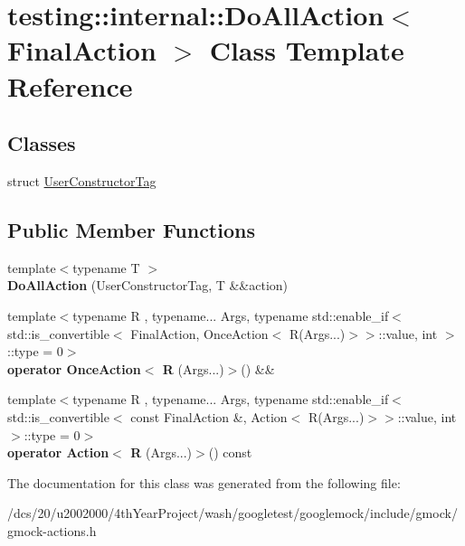 \hypertarget{classtesting_1_1internal_1_1DoAllAction_3_01FinalAction_01_4}{}\section{testing\+:\+:internal\+:\+:Do\+All\+Action$<$ Final\+Action $>$ Class Template Reference}
\label{classtesting_1_1internal_1_1DoAllAction_3_01FinalAction_01_4}
\subsection*{Classes}
\begin{DoxyCompactItemize}
\item 
struct \mbox{\hyperlink{structtesting_1_1internal_1_1DoAllAction_3_01FinalAction_01_4_1_1UserConstructorTag}{User\+Constructor\+Tag}}
\end{DoxyCompactItemize}
\subsection*{Public Member Functions}
\begin{DoxyCompactItemize}
\item 
\mbox{\label{classtesting_1_1internal_1_1DoAllAction_3_01FinalAction_01_4_a3b684657848bea3f1b498a1c9b65a346}} 
{\footnotesize template$<$typename T $>$ }\\{\bfseries Do\+All\+Action} (User\+Constructor\+Tag, T \&\&action)
\item 
\mbox{\label{classtesting_1_1internal_1_1DoAllAction_3_01FinalAction_01_4_a15c6ce41453fb2668717ca2f69a0ef06}} 
{\footnotesize template$<$typename R , typename... Args, typename std\+::enable\+\_\+if$<$ std\+::is\+\_\+convertible$<$ Final\+Action, Once\+Action$<$ R(\+Args...)$>$$>$\+::value, int $>$\+::type  = 0$>$ }\\{\bfseries operator Once\+Action$<$ R} (Args...)$>$() \&\&
\item 
\mbox{\label{classtesting_1_1internal_1_1DoAllAction_3_01FinalAction_01_4_acc23595cbb083c3d6f2af3a13ca4d948}} 
{\footnotesize template$<$typename R , typename... Args, typename std\+::enable\+\_\+if$<$ std\+::is\+\_\+convertible$<$ const Final\+Action \&, Action$<$ R(\+Args...)$>$$>$\+::value, int $>$\+::type  = 0$>$ }\\{\bfseries operator Action$<$ R} (Args...)$>$() const
\end{DoxyCompactItemize}


The documentation for this class was generated from the following file\+:\begin{DoxyCompactItemize}
\item 
/dcs/20/u2002000/4th\+Year\+Project/wash/googletest/googlemock/include/gmock/gmock-\/actions.\+h\end{DoxyCompactItemize}
